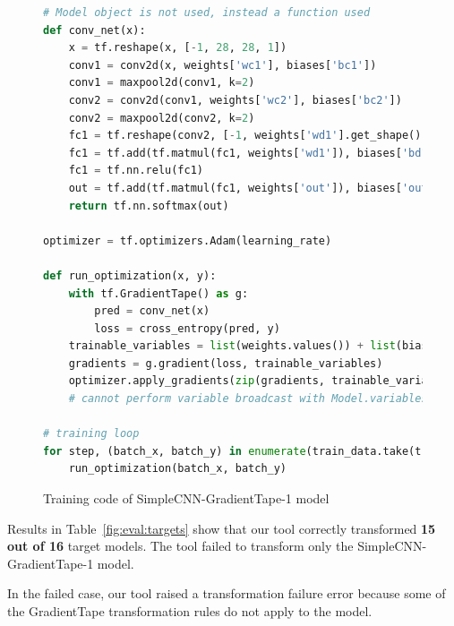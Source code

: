 \begin{figure}[!ht]\centering
  \begin{lstlisting}[language=Python, upquote=true]
# Model object is not used, instead a function used
def conv_net(x):
    x = tf.reshape(x, [-1, 28, 28, 1])
    conv1 = conv2d(x, weights['wc1'], biases['bc1'])
    conv1 = maxpool2d(conv1, k=2)
    conv2 = conv2d(conv1, weights['wc2'], biases['bc2'])
    conv2 = maxpool2d(conv2, k=2)
    fc1 = tf.reshape(conv2, [-1, weights['wd1'].get_shape().as_list()[0]])
    fc1 = tf.add(tf.matmul(fc1, weights['wd1']), biases['bd1'])
    fc1 = tf.nn.relu(fc1)
    out = tf.add(tf.matmul(fc1, weights['out']), biases['out'])
    return tf.nn.softmax(out)

optimizer = tf.optimizers.Adam(learning_rate)

def run_optimization(x, y):
    with tf.GradientTape() as g:
        pred = conv_net(x)
        loss = cross_entropy(pred, y) 
    trainable_variables = list(weights.values()) + list(biases.values())
    gradients = g.gradient(loss, trainable_variables)
    optimizer.apply_gradients(zip(gradients, trainable_variables))
    # cannot perform variable broadcast with Model.variables

# training loop
for step, (batch_x, batch_y) in enumerate(train_data.take(training_steps), 1):
    run_optimization(batch_x, batch_y)\end{lstlisting}
  \caption{Training code of SimpleCNN-GradientTape-1 model}
  \label{fig:eval:simplecnn1}
\end{figure}


\begin{inred}
Results in Table~\ref{fig:eval:targets} show that our tool correctly transformed
\textbf{15 out of 16} target models.
The tool failed to transform only the SimpleCNN-GradientTape-1 model.
\end{inred}
In the failed case, our tool raised a transformation failure error because
some of the GradientTape transformation rules do not apply to the model.



